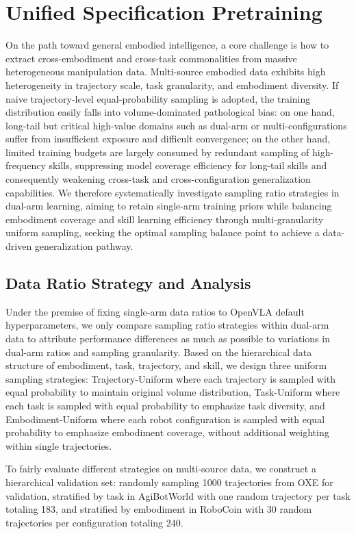 \documentclass[11pt,a4paper]{article}
\begin{document}
\section{Unified Specification Pretraining}

On the path toward general embodied intelligence, a core challenge is how to extract cross-embodiment and cross-task commonalities from massive heterogeneous manipulation data. Multi-source embodied data exhibits high heterogeneity in trajectory scale, task granularity, and embodiment diversity. If naive trajectory-level equal-probability sampling is adopted, the training distribution easily falls into volume-dominated pathological bias: on one hand, long-tail but critical high-value domains such as dual-arm or multi-configurations suffer from insufficient exposure and difficult convergence; on the other hand, limited training budgets are largely consumed by redundant sampling of high-frequency skills, suppressing model coverage efficiency for long-tail skills and consequently weakening cross-task and cross-configuration generalization capabilities. We therefore systematically investigate sampling ratio strategies in dual-arm learning, aiming to retain single-arm training priors while balancing embodiment coverage and skill learning efficiency through multi-granularity uniform sampling, seeking the optimal sampling balance point to achieve a data-driven generalization pathway.

\subsection{Data Ratio Strategy and Analysis}

Under the premise of fixing single-arm data ratios to OpenVLA default hyperparameters, we only compare sampling ratio strategies within dual-arm data to attribute performance differences as much as possible to variations in dual-arm ratios and sampling granularity. Based on the hierarchical data structure of embodiment, task, trajectory, and skill, we design three uniform sampling strategies: Trajectory-Uniform where each trajectory is sampled with equal probability to maintain original volume distribution, Task-Uniform where each task is sampled with equal probability to emphasize task diversity, and Embodiment-Uniform where each robot configuration is sampled with equal probability to emphasize embodiment coverage, without additional weighting within single trajectories.

To fairly evaluate different strategies on multi-source data, we construct a hierarchical validation set: randomly sampling 1000 trajectories from OXE for validation, stratified by task in AgiBotWorld with one random trajectory per task totaling 183, and stratified by embodiment in RoboCoin with 30 random trajectories per configuration totaling 240.
\end{document}
